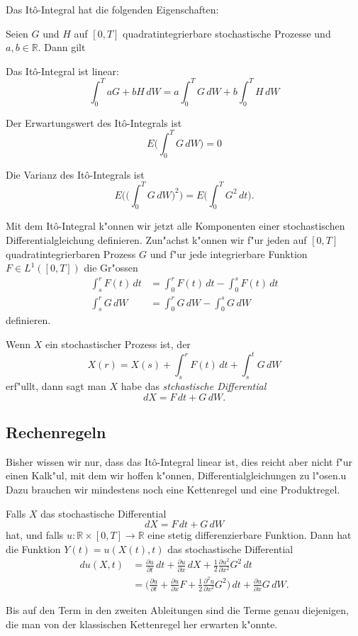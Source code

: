 Das It\^o-Integral hat die folgenden Eigenschaften:

\begin{satz}
\label{satz:ito-integral}
Seien $G$ und $H$ auf $[0,T]$ quadratintegrierbare stochastische Prozesse
und $a,b\in\mathbb R$. Dann gilt
\begin{compactenum}
\item Das It\^o-Integral ist linear:
\[
\int_0^T aG+bH\,dW
=
a\int_0^TG\,dW
+
b\int_0^TH\,dW
\]
\item Der Erwartungswert des It\^o-Integrals ist
\[
E\biggl(\int_0^T G\,dW\biggr)=0
\]
\item Die Varianz des It\^o-Integrals ist
\[
E\biggl(\biggl(\int_0^TG\,dW\biggr)^2\biggr)
=
E\biggl(\int_0^T G^2\,dt\biggr).
\]
\end{compactenum}
\end{satz}

Mit dem It\^o-Integral k"onnen wir jetzt alle Komponenten einer
stochastischen Differentialgleichung definieren.
Zun"achst k"onnen wir f"ur jeden auf $[0,T]$ quadratintegrierbaren Prozess $G$ 
und f"ur jede integrierbare Funktion $F\in L^1([0,T])$ die Gr"ossen
\begin{align*}
\int_s^r F(t)\,dt&=\int_0^r F(t)\,dt - \int_0^s F(t)\,dt
\\
\int_s^r G\,dW&=\int_0^r G\,dW - \int_0^s G\,dW
\end{align*}
definieren.
\begin{definition}
Wenn $X$ ein stochastischer Prozess ist, der
\[
X(r)=X(s)+\int_s^rF(t)\,dt + \int_s^tG\,dW
\]
erf"ullt, dann sagt man $X$ habe das {\em stchastische Differential}
\[
dX=F\,dt + G\,dW.
\]
\end{definition}

%
%
%
\subsection{Rechenregeln}
Bisher wissen wir nur, dass das It\^o-Integral linear ist, dies reicht
aber nicht f"ur einen Kalk"ul, mit dem wir hoffen k"onnen,
Differentialgleichungen zu l"osen.u
Dazu brauchen wir mindestens noch eine Kettenregel und eine
Produktregel.

\begin{satz}[It\^o's Kettenregel]
Falls $X$ das stochastische Differential
\[
dX=F\,dt + G\,dW
\]
hat, und falls $u\colon \mathbb R\times [0,T]\to\mathbb R$ eine
stetig differenzierbare Funktion.
Dann hat die Funktion $Y(t)=u(X(t), t)$ das stochastische Differential
\begin{align*}
du(X,t)
&=\frac{\partial u}{\partial t}\,dt + \frac{\partial u}{\partial x}\,dX 
+\frac12\frac{\partial u^2}{\partial x^2}G^2\,dt
\\
&=
\biggl(
\frac{\partial u}{\partial t}+\frac{\partial u}{\partial x}F
+\frac12\frac{\partial^2u}{\partial x^2}G^2
\biggr)\,dt
+
\frac{\partial u}{\partial x}G\,dW.
\end{align*}
\end{satz}
Bis auf den Term in den zweiten Ableitungen sind die Terme genau
diejenigen, die man von der klassischen Kettenregel her erwarten
k"onnte.

